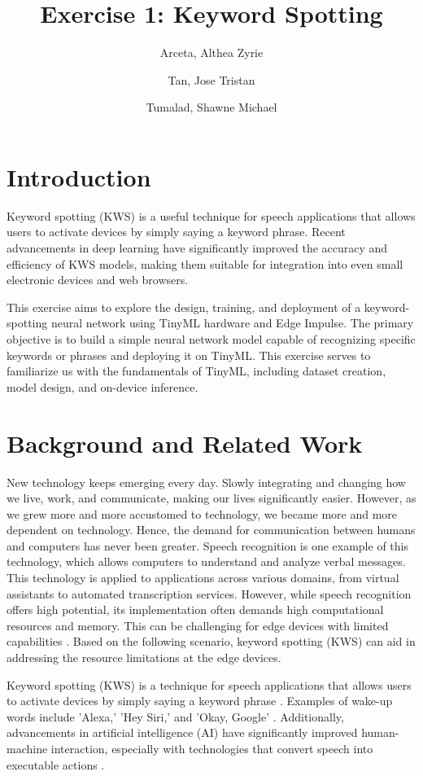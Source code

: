 \documentclass{article}
\author[1]{Arceta, Althea Zyrie}
\author[2]{Tan, Jose Tristan}
\author[3]{Tumalad, Shawne Michael}
\affil[1]{althea\_arceta@dlsu.edu.ph}
\affil[2]{tristan\_tan@dlsu.edu.ph}
\affil[3]{shawne\_tumalad@dlsu.edu.ph}
\title{Exercise 1: Keyword Spotting}
\begin{document}
\maketitle

\section{Introduction}
\label{sec:introduction}
Keyword spotting (KWS) is a useful technique for speech applications that allows users to activate devices by simply saying a keyword phrase. Recent advancements in deep learning have significantly improved the accuracy and efficiency of KWS models, making them suitable for integration into even small electronic devices and web browsers.

This exercise aims to explore the design, training, and deployment of a keyword-spotting neural network using TinyML hardware and Edge Impulse. The primary objective is to build a simple neural network model capable of recognizing specific keywords or phrases and deploying it on TinyML. This exercise serves to familiarize us with the fundamentals of TinyML, including dataset creation, model design, and on-device inference.

\section{Background and Related Work}
\label{sec:bg_and_rw}
New technology keeps emerging every day. Slowly integrating and changing how we live, work, and communicate, making our lives significantly easier. However, as we grew more and more accustomed to technology, we became more and more dependent on technology. Hence, the demand for communication between humans and computers has never been greater. Speech recognition is one example of this technology, which allows computers to understand and analyze verbal messages. This technology is applied to applications across various domains, from virtual assistants to automated transcription services. However, while speech recognition offers high potential, its implementation often demands high computational resources and memory. This can be challenging for edge devices with limited capabilities \cite{SpeechRecog}. Based on the following scenario, keyword spotting (KWS) can aid in addressing the resource limitations at the edge devices.

Keyword spotting (KWS) is a technique for speech applications that allows users to activate devices by simply saying a keyword phrase \cite{10528680}. Examples of wake-up words include 'Alexa,'\cite{Amazon} 'Hey Siri,'\cite{Siri} and 'Okay, Google' \cite{Google}. Additionally, advancements in artificial intelligence (AI) have significantly improved human-machine interaction, especially with technologies that convert speech into executable actions \cite{KHEDDAR2024102422}.
\end{document}
